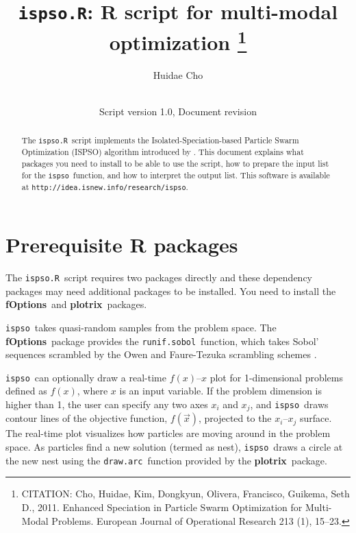\documentclass{article}
\def\ispsoR{\texttt{ispso.R}}
\def\ispso{\texttt{ispso}}
\def\fOptions{\textbf{fOptions}}
\def\plotrix{\textbf{plotrix}}
\def\runifsobol{\texttt{runif.sobol}}
\def\drawarc{\texttt{draw.arc}}
\begin{document}
\title{\ispsoR: R script for multi-modal optimization%
\footnote{CITATION: Cho, Huidae, Kim, Dongkyun, Olivera, Francisco, Guikema, Seth D., 2011.  Enhanced Speciation in Particle Swarm Optimization for Multi-Modal Problems.  European Journal of Operational Research 213 (1), 15--23.}}
\author{Huidae Cho}
\date{\RCSDate\\Script version 1.0, Document revision \RCSRevision}
\maketitle

\begin{abstract}
  The \ispsoR\ script implements the Isolated-Speciation-based Particle Swarm Optimization (ISPSO) algorithm introduced by \cite{Cho.ea.2011}.
  This document explains what packages you need to install to be able to use the script, how to prepare the input list for the \ispso\ function, and how to interpret the output list.
  This software is available at \texttt{http://idea.isnew.info/research/ispso}.
\end{abstract}

\tableofcontents

\section{Prerequisite R packages}

The \ispsoR\ script requires two packages directly and these dependency packages may need additional packages to be installed.
You need to install the \fOptions\ and \plotrix\ packages.

\ispso\ takes quasi-random samples from the problem space.
The \fOptions\ package provides the \runifsobol\ function, which takes Sobol' sequences \citep{Sobol'.1967} scrambled by the Owen and Faure-Tezuka scrambling schemes \citep{Owen.1998, Faure.Tezuka.2002}.

\ispso\ can optionally draw a real-time $f(x)$--$x$ plot for 1-dimensional problems defined as $f(x)$, where $x$ is an input variable.
If the problem dimension is higher than 1, the user can specify any two axes $x_i$ and $x_j$, and \ispso\ draws contour lines of the objective function, $f(\vec{x})$, projected to the $x_i$--$x_j$ surface.
The real-time plot visualizes how particles are moving around in the problem space.
As particles find a new solution (termed as nest), \ispso\ draws a circle at the new nest using the \drawarc\ function provided by the \plotrix\ package.
\end{document}
